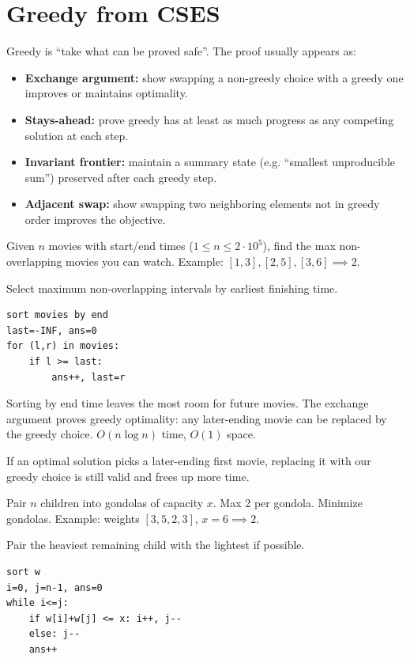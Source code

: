 \section{Greedy from CSES}

Greedy is ``take what can be proved safe''. The proof usually appears as:
\begin{itemize}
	\item \textbf{Exchange argument:} show swapping a non-greedy choice with a greedy one improves or maintains optimality.
	\item \textbf{Stays-ahead:} prove greedy has at least as much progress as any competing solution at each step.
	\item \textbf{Invariant frontier:} maintain a summary state (e.g. ``smallest unproducible sum'') preserved after each greedy step.
	\item \textbf{Adjacent swap:} show swapping two neighboring elements not in greedy order improves the objective.
\end{itemize}


\Problem Given $n$ movies with start/end times ($1 \le n \le 2 \cdot 10^5$), find the max non-overlapping movies you can watch. Example: $[1,3],[2,5],[3,6] \implies 2$.

Select maximum non-overlapping intervals by earliest finishing time.
\begin{lstlisting}
sort movies by end
last=-INF, ans=0
for (l,r) in movies:
    if l >= last:
        ans++, last=r
\end{lstlisting}

\Solution Sorting by end time leaves the most room for future movies. The exchange argument proves greedy optimality: any later-ending movie can be replaced by the greedy choice. $O(n \log n)$ time, $O(1)$ space.

\Analysis If an optimal solution picks a later-ending first movie, replacing it with our greedy choice is still valid and frees up more time.


\Problem Pair $n$ children into gondolas of capacity $x$. Max 2 per gondola. Minimize gondolas. Example: weights $[3,5,2,3]$, $x=6 \implies 2$.

Pair the heaviest remaining child with the lightest if possible.
\begin{lstlisting}
sort w
i=0, j=n-1, ans=0
while i<=j:
    if w[i]+w[j] <= x: i++, j--
    else: j--
    ans++
\end{lstlisting}

